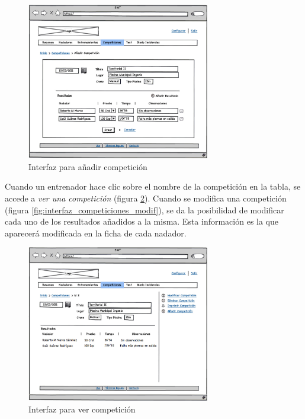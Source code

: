 		\begin{figure}[H]
		  \centering
		    \includegraphics[width=8cm]{./eps/15_Competiciones_new.eps}
		  \caption{Interfaz para añadir competición}
		  \label{fig:interfaz_competiciones_new}
		\end{figure}

Cuando un entrenador hace clic sobre el nombre de la competición en la tabla, se accede a {\it ver una competición} (figura \ref{fig:interfaz_competiciones_show}). Cuando se modifica una competición (figura \ref{fig:interfaz_competiciones_modif}), se da la posibilidad de modificar cada uno de los resultados añadidos a la misma. Esta información es la que aparecerá modificada en la ficha de cada nadador.

		\begin{figure}[H]
		  \centering
		    \includegraphics[width=8cm]{./eps/16_Competiciones_show.eps}
		  \caption{Interfaz para ver competición}
		  \label{fig:interfaz_competiciones_show}
		\end{figure}

